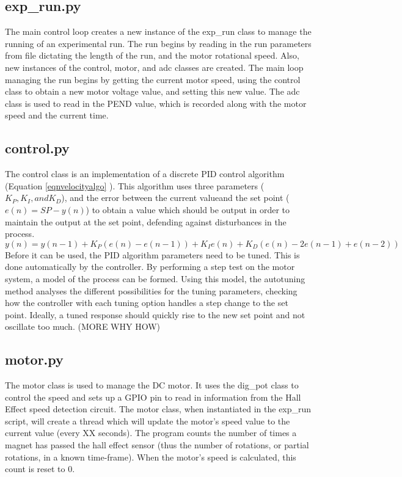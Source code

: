 \documentclass[a4]{report}
\begin{document}
	\subsection{exp\_run.py}
	The main control loop creates a new instance of the exp\_run class to manage the running of an experimental run. The run begins by reading in the run parameters from file dictating the length of the run, and the motor rotational speed. Also, new instances of the control, motor, and adc classes are created. The main loop managing the run begins by getting the current motor speed, using the control class to obtain a new motor voltage value, and setting this new value. The adc class is used to read in the PEND value, which is recorded along with the motor speed and the current time.
	\subsection{control.py}
	The control class is an implementation of a discrete PID control algorithm (Equation \ref{eqnvelocityalgo} \cite[p.~14]{PIDcontroldiscr}). This algorithm uses three parameters (\( K_P, K_I, and K_D\)), and the error between the current valueand the set point (\(e(n) = SP - y(n)\)) to obtain a value which should be output in order to maintain the output at the set point, defending against disturbances in the process.\newline
	\begin{equation}
		y(n) = y(n-1) + K_P (e(n) - e(n-1)) + K_I  e(n) + K_D (e(n) -2 e(n-1) + e(n-2))
		\label{eqnvelocityalgo}
	\end{equation}\newline \noindent
	Before it can be used, the PID algorithm parameters need to be tuned. This is done automatically by the controller. By performing a step test on the motor system, a model of the process can be formed. Using this model, the autotuning method analyses the different possibilities for the tuning parameters, checking how the controller with each tuning option handles a step change to the set point. Ideally, a tuned response should quickly rise to the new set point and not oscillate too much. (MORE WHY HOW)
	\subsection{motor.py}
	The motor class is used to manage the DC motor. It uses the dig\_pot class to control the speed and sets up a GPIO pin to read in information from the Hall Effect speed detection circuit. The motor class, when instantiated in the exp\_run script, will create a thread which will update the motor's speed value to the current value (every XX seconds). The program counts the number of times a magnet has passed the hall effect sensor (thus the number of rotations, or partial rotations, in a known time-frame). When the motor's speed is calculated, this count is reset to 0.
\end{document}
